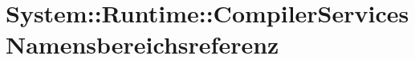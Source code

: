 \hypertarget{namespaceSystem_1_1Runtime_1_1CompilerServices}{
\section{System::Runtime::Compiler\-Services Namensbereichsreferenz}
\label{namespaceSystem_1_1Runtime_1_1CompilerServices}
}




